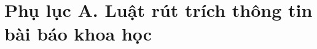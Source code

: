 \chapter*{Phụ lục A. Luật rút trích thông tin bài báo khoa học}
\ifpdf
    \graphicspath{{Appendix1/Appendix1Figs/PNG/}{Appendix1/Appendix1Figs/PDF/}{Appendix1/Appendix1Figs/}}
\else
    \graphicspath{{Appendix1/Appendix1Figs/EPS/}{Appendix1/Appendix1Figs/}}
\fi

%
%
